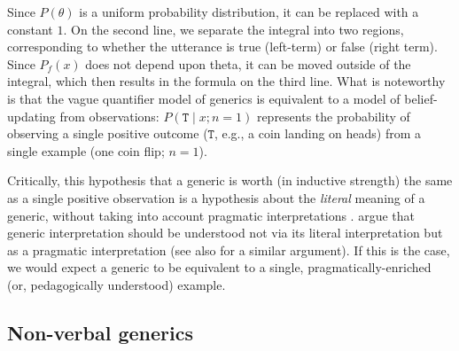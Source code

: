 \documentclass[10pt,letterpaper]{article}
\begin{document}
Since $P(\theta)$ is a uniform probability distribution, it can be replaced with a constant $1$. On the second line, we separate the integral into two regions, corresponding to whether the utterance is true (left-term) or false (right term).
Since $P_f(x)$ does not depend upon theta, it can be moved outside of the integral, which then results in the formula on the third line. 
What is noteworthy is that the vague quantifier model of generics is equivalent to a model of belief-updating from observations: $P(\texttt{T} \mid x; n=1)$ represents the probability of observing a single positive outcome ($\texttt{T}$, e.g., a coin landing on heads) from a single example (one coin flip; $n=1$). 

Critically, this hypothesis that a generic is worth (in inductive strength) the same as a single positive observation is a hypothesis about the \emph{literal} meaning of a generic, without taking into account pragmatic interpretations \cite{grice1975logic}. %
 argue that generic interpretation should be understood not via its literal interpretation but as a pragmatic interpretation (see also  for a similar argument). 
If this is the case, we would expect a generic to be equivalent to a single, pragmatically-enriched (or, pedagogically understood) example. 



\subsection{Non-verbal generics}
\end{document}
